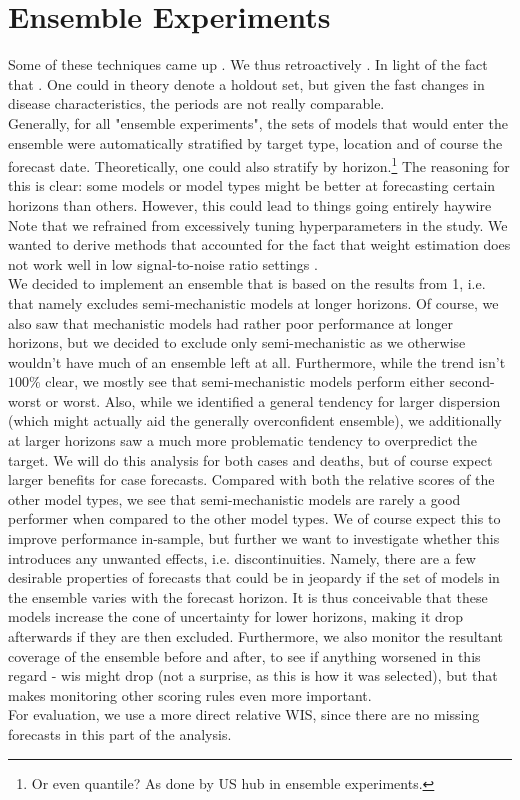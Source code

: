 \section{Ensemble Experiments}
Some of these techniques came up . We thus retroactively . In light of the fact that . One could in theory denote a holdout set, but given the fast changes in disease characteristics, the periods are not really comparable.\\ 
Generally, for all "ensemble experiments", the sets of models that would enter the ensemble were automatically stratified by target type, location and of course the forecast date. Theoretically, one could also stratify by horizon.\footnote{Or even quantile? As done by US hub in ensemble experiments.} The reasoning for this is clear: some models or model types might be better at forecasting certain horizons than others. However, this could lead to things going entirely haywire \\
Note that we refrained from excessively tuning hyperparameters in the study.
We wanted to derive methods that accounted for the fact that weight estimation does not work well in low signal-to-noise ratio settings \cite{claeskens_forecast_2016}.\\
We decided to implement an ensemble that is based on the results from 1, i.e. that namely excludes semi-mechanistic models at longer horizons. Of course, we also saw that mechanistic models had rather poor performance at longer horizons, but we decided to exclude only semi-mechanistic as we otherwise wouldn't have much of an ensemble left at all. Furthermore, while the trend isn't $100\%$ clear, we mostly see that semi-mechanistic models perform either second-worst or worst. Also, while we identified a general tendency for larger dispersion (which might actually aid the generally overconfident ensemble), we additionally at larger horizons saw a much more problematic tendency to overpredict the target. We will do this analysis for both cases and deaths, but of course expect larger benefits for case forecasts. Compared with both the relative scores of the other model types, we see that semi-mechanistic models are rarely a good performer when compared to the other model types.  We of course expect this to improve performance in-sample, but further we want to investigate whether this introduces any unwanted effects, i.e. discontinuities. Namely, there are a few desirable properties of forecasts that could be in jeopardy if the set of models in the ensemble varies with the forecast horizon. It is thus conceivable that these models increase the cone of uncertainty for lower horizons, making it drop afterwards if they are then excluded. Furthermore, we also monitor the resultant coverage of the ensemble before and after, to see if anything worsened in this regard - wis might drop (not a surprise, as this is how it was selected), but that makes monitoring other scoring rules even more important. \\
For evaluation, we use a more direct relative WIS, since there are no missing forecasts in this part of the analysis.\\
